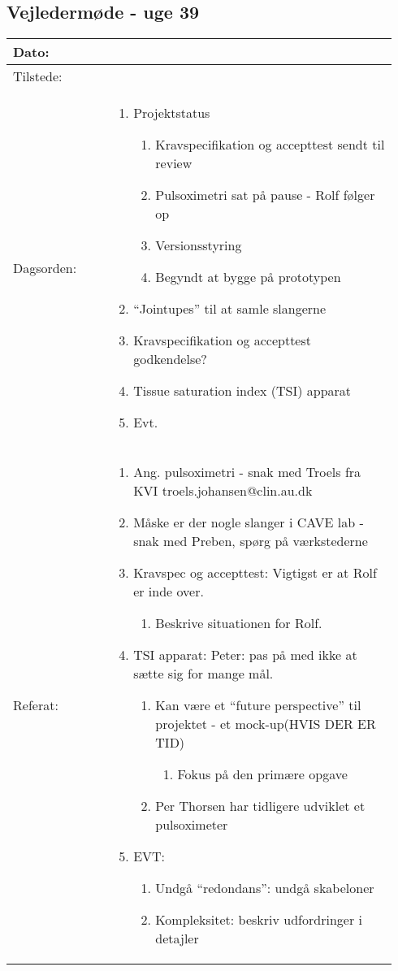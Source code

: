 	\subsection{Vejledermøde - uge 39}
	\begin{longtable}{|p{0.24\linewidth}|p{0.7\linewidth}|}
		\hline
		Dato: & \\ \hline
		Tilstede: & \\ \hline
		Dagsorden: &
		\begin{enumerate}
			\item Projektstatus
			\begin{enumerate}
				\item Kravspecifikation og accepttest sendt til review
				\item Pulsoximetri sat på pause - Rolf følger op
				\item Versionsstyring
				\item Begyndt at bygge på prototypen 
			\end{enumerate}
			\item “Jointupes” til at samle slangerne
			\item Kravspecifikation og accepttest godkendelse?
			\item Tissue saturation index (TSI) apparat
			\item Evt. 
		\end{enumerate}
		\\ \hline
		Referat: & 
		\begin{enumerate}
			\item Ang. pulsoximetri - snak med Troels fra KVI troels.johansen@clin.au.dk
			\item Måske er der nogle slanger i CAVE lab - snak med Preben, spørg på værkstederne
			\item Kravspec og accepttest: Vigtigst er at Rolf er inde over. 
			\begin{enumerate}
				\item Beskrive situationen for Rolf. 
			\end{enumerate}
			\item TSI apparat: Peter: pas på med ikke at sætte sig for mange mål.
			\begin{enumerate}
				\item Kan være et “future perspective” til projektet - et mock-up(HVIS DER ER TID) 
				\begin{enumerate}
					\item Fokus på den primære opgave 
				\end{enumerate}
				\item Per Thorsen har tidligere udviklet et pulsoximeter
			\end{enumerate}
			\item EVT:
			\begin{enumerate}
				\item Undgå “redondans”: undgå skabeloner
				\item Kompleksitet: beskriv udfordringer i detajler
			\end{enumerate}
		\end{enumerate}
		\\ \hline
	\end{longtable}
	

